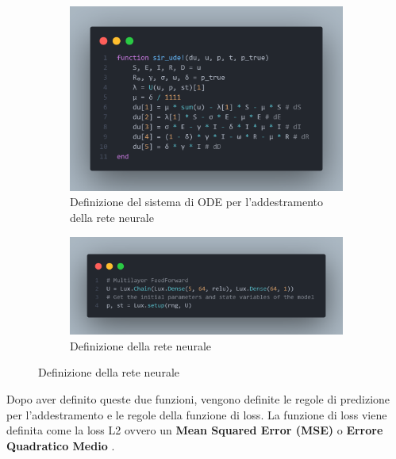 \begin{figure}[!hb]
	\centering
	\begin{subfigure}[b]{0.45\textwidth}
		\centering
		\includegraphics[width=\textwidth]{img/seir_function.png}
		\caption{Definizione del sistema di ODE per l'addestramento della rete neurale}
		\label{fig:seir_function}
	\end{subfigure}
	\hfill
	\begin{subfigure}[b]{0.45\textwidth}
		\centering
		\includegraphics[width=\textwidth]{img/neural_ode.png}
		\caption{Definizione della rete neurale}
		\label{fig:neural_ode}
	\end{subfigure}
\end{figure}

Dopo aver definito queste due funzioni, vengono definite le regole di predizione
per l'addestramento e le regole della funzione di loss. La funzione di loss viene definita 
come la loss L2 ovvero un \textbf{Mean Squared Error (MSE)} o \textbf{Errore Quadratico Medio}
\cite{wiki:Mean_squared_error}.

